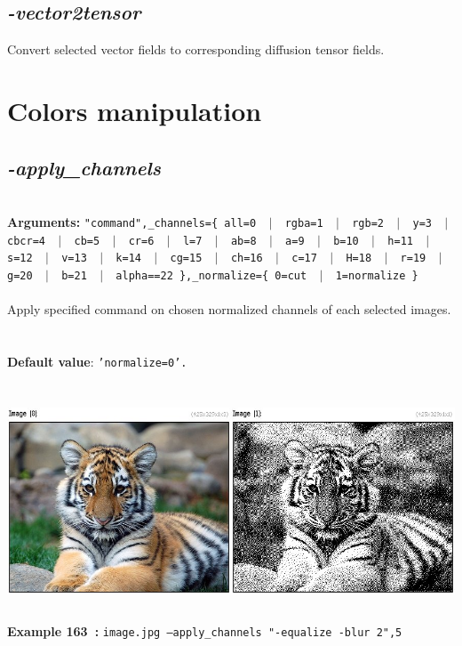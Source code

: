 \documentclass[a4paper,11pt,twoside]{book}
\begin{document}
\subsection{\emph{-vector2tensor} }\vspace*{-0.5em}
Convert selected vector fields to corresponding diffusion tensor fields.

\section{Colors manipulation}


\subsection{\emph{-apply\_channels} }\vspace*{-0.5em}
~\\\textbf{Arguments: } 
{\small \texttt{"command",\_channels=\{ all=0 ~$|$~ rgba=1 ~$|$~ rgb=2 ~$|$~ y=3 ~$|$~ cbcr=4 ~$|$~ cb=5 ~$|$~ cr=6 ~$|$~ l=7 ~$|$~ ab=8 ~$|$~ a=9 ~$|$~ b=10 ~$|$~ h=11 ~$|$~ s=12 ~$|$~ v=13 ~$|$~ k=14 ~$|$~ cg=15 ~$|$~ ch=16 ~$|$~ c=17 ~$|$~ H=18 ~$|$~ r=19 ~$|$~ g=20 ~$|$~ b=21 ~$|$~ alpha==22 \},\_normalize=\{ 0=cut ~$|$~ 1=normalize \}}}\\~\\
Apply specified command on chosen normalized channels of each selected images.
~\\~\\\textbf{Default value}: {\small \texttt{'normalize=0'.}}
\begin{center}\includegraphics[keepaspectratio=true,height=7cm,width=\textwidth]{img/gmic_def163.jpg}\\
{\footnotesize \textbf{Example 163~:} \texttt{image.jpg --apply\_channels "-equalize -blur 2",5}}
\end{center}
\end{document}
